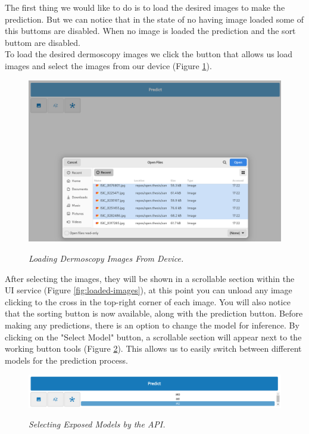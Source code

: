 The first thing we would like to do is to load the desired images to make the
prediction. But we can notice that in the state of no having image loaded some
of this buttoms are disabled. When no image is loaded the prediction and the
sort buttom are disabled. \\

To load the desired dermoscopy images we click the button that allows us load
images and select the images from our device
(Figure \ref{fig:selecting-imgs}).

\begin{figure}[H]
  \centering
  \includegraphics[width=\textwidth]{imatges/results/selecting-images.png}
  \caption[Loading Dermoscopy Images From Device]{\textit{Loading Dermoscopy Images From Device. }}
  {\label{fig:selecting-imgs}}
\end{figure}

After selecting the images, they will be shown in a scrollable section within
the UI service (Figure \ref{fig:loaded-images}), at this point you can
unload any image clicking to the cross in the top-right corner of each image.
You will also notice that the sorting button is now available, along with the
prediction button. Before making any predictions, there is an option to change
the model for inference. By clicking on the "Select Model" button, a scrollable
section will appear next to the working button tools (Figure
\ref{fig:selecting-model}). This allows us to easily switch between different
models for the prediction process.

\begin{figure}[H]
  \centering
  \includegraphics[width=\textwidth]{imatges/results/selecting-model.png}
  \caption[Selecting Exposed Models by the API]{\textit{Selecting Exposed Models by the API. }}
  {\label{fig:selecting-model}}
\end{figure}


